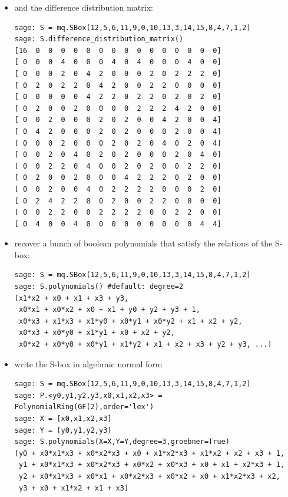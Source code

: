 \documentclass[9pt]{beamer}
\begin{document}
\begin{frame}
\begin{itemize}
\framebreak

\item and the difference distribution matrix:
\begin{lstlisting}
sage: S = mq.SBox(12,5,6,11,9,0,10,13,3,14,15,8,4,7,1,2)
sage: S.difference_distribution_matrix()
[16  0  0  0  0  0  0  0  0  0  0  0  0  0  0  0]
[ 0  0  0  4  0  0  0  4  0  4  0  0  0  4  0  0]
[ 0  0  0  2  0  4  2  0  0  0  2  0  2  2  2  0]
[ 0  2  0  2  2  0  4  2  0  0  2  2  0  0  0  0]
[ 0  0  0  0  0  4  2  2  0  2  2  0  2  0  2  0]
[ 0  2  0  0  2  0  0  0  0  2  2  2  4  2  0  0]
[ 0  0  2  0  0  0  2  0  2  0  0  4  2  0  0  4]
[ 0  4  2  0  0  0  2  0  2  0  0  0  2  0  0  4]
[ 0  0  0  2  0  0  0  2  0  2  0  4  0  2  0  4]
[ 0  0  2  0  4  0  2  0  2  0  0  0  2  0  4  0]
[ 0  0  2  2  0  4  0  0  2  0  2  0  0  2  2  0]
[ 0  2  0  0  2  0  0  0  4  2  2  2  0  2  0  0]
[ 0  0  2  0  0  4  0  2  2  2  2  0  0  0  2  0]
[ 0  2  4  2  2  0  0  2  0  0  2  2  0  0  0  0]
[ 0  0  2  2  0  0  2  2  2  2  0  0  2  2  0  0]
[ 0  4  0  0  4  0  0  0  0  0  0  0  0  0  4  4]
\end{lstlisting}
\framebreak

\item recover a bunch of boolean polynomials that satisfy the relations of the S-box:
\begin{lstlisting}
sage: S = mq.SBox(12,5,6,11,9,0,10,13,3,14,15,8,4,7,1,2)
sage: S.polynomials() #default: degree=2
[x1*x2 + x0 + x1 + x3 + y3,
 x0*x1 + x0*x2 + x0 + x1 + y0 + y2 + y3 + 1,
 x0*x3 + x1*x3 + x1*y0 + x0*y1 + x0*y2 + x1 + x2 + y2,
 x0*x3 + x0*y0 + x1*y1 + x0 + x2 + y2,
 x0*x2 + x0*y0 + x0*y1 + x1*y2 + x1 + x2 + x3 + y2 + y3, ...]
\end{lstlisting}

\item write the S-box in algebraic normal form
\begin{lstlisting}
sage: S = mq.SBox(12,5,6,11,9,0,10,13,3,14,15,8,4,7,1,2)
sage: P.<y0,y1,y2,y3,x0,x1,x2,x3> = PolynomialRing(GF(2),order='lex')
sage: X = [x0,x1,x2,x3]
sage: Y = [y0,y1,y2,y3]
sage: S.polynomials(X=X,Y=Y,degree=3,groebner=True)
[y0 + x0*x1*x3 + x0*x2*x3 + x0 + x1*x2*x3 + x1*x2 + x2 + x3 + 1,
 y1 + x0*x1*x3 + x0*x2*x3 + x0*x2 + x0*x3 + x0 + x1 + x2*x3 + 1,
 y2 + x0*x1*x3 + x0*x1 + x0*x2*x3 + x0*x2 + x0 + x1*x2*x3 + x2,
 y3 + x0 + x1*x2 + x1 + x3]
\end{lstlisting}
\end{itemize}

\end{frame}
\end{document}
